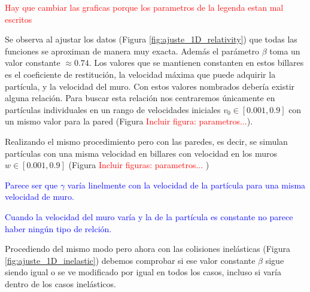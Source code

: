 \documentclass[11pt, spanish]{book}
\begin{document}
\textcolor{red}{Hay que cambiar las graficas porque los parametros de la legenda estan mal escritos}

\vspace{3mm}

Se observa al ajustar los datos (Figura \ref{fig:ajuste_1D_relativity}) que todas las funciones se aproximan de manera muy exacta. Además el parámetro \( \beta \) toma un valor constante \( \approx 0.74 \). Los valores que se mantienen constanten en estos billares es el coeficiente de restitución, la velocidad máxima que puede adquirir la partícula, y la velocidad del muro. Con estos valores nombrados debería existir alguna relación. Para buscar esta relación nos centraremos únicamente en partículas individuales en un rango de velocidades iniciales \( v_0 \in [0.001, 0.9] \) con un mismo valor para la pared (Figura \textcolor{red}{Incluir figura: parametros...}). 

Realizando el mismo procedimiento pero con las paredes, es decir, se simulan partículas con una misma velocidad en billares con velocidad en los muros \( w \in [0.001, 0.9] \) (Figura \textcolor{red}{Incluir figuras: parametros...} )

\textcolor{blue}{Parece ser que \( \gamma \) varía linelmente con la velocidad de la partícula para una misma velocidad de muro.}

\textcolor{blue}{Cuando la velocidad del muro varía y la de la partícula es constante no parece haber ningún tipo de relción. }


Procediendo del mismo modo pero ahora con las colisiones inelásticas (Figura \ref{fig:ajuste_1D_inelastic}) debemos comprobar si ese valor constante \( \beta \) sigue siendo igual o se ve modificado por igual en todos los casos, incluso si varía dentro de los casos inelásticos. 
\end{document}

